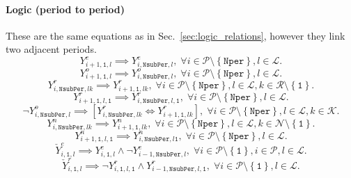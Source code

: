 \documentclass{amsbook}
\begin{document}
\paragraph{Logic (period to period)}
%
These are the same equations as in Sec.~\ref{sec:logic_relations}, however they
link two adjacent periods.
\begin{equation}
    Y^e_{i+1,\mathtt{1},l} \implies Y^e_{i, \mathtt{NsubPer}, l}, \; \forall 
    i \in \mathcal{P} \setminus \left\{\mathtt{Nper}\right\},
    l\in \mathcal{L}.
\end{equation}
%
%
\begin{equation}
    Y^o_{i+1,\mathtt{1},l} \implies Y^o_{i,\mathtt{NsubPer},l}, \; \forall 
    i \in \mathcal{P} \setminus \left\{\mathtt{Nper}\right\},
    l\in \mathcal{L}.
\end{equation}
%
%
\begin{equation}
    Y^r_{i,\mathtt{NsubPer},lk} \implies Y^r_{i+1, \mathtt{1}, lk}, \; \forall 
    i \in \mathcal{P} \setminus \left\{\mathtt{Nper}\right\},
    l\in \mathcal{L},
    k\in \mathcal{R} \setminus \left\{\mathtt{1}\right\}.
\end{equation}
%
%
\begin{equation}
    Y^r_{i+1, \mathtt{1}, l,\mathtt{1}} \implies 
    Y^r_{i,\mathtt{NsubPer},l,\mathtt{1}} , \; \forall 
    i \in \mathcal{P} \setminus \left\{\mathtt{Nper}\right\},
    l\in \mathcal{L}.
\end{equation}
%
%
\begin{equation}
    \neg Y^o_{i,\mathtt{NsubPer},l} \implies 
    \left[Y^r_{i,\mathtt{NsubPer},lk} \iff 
    Y^r_{i+1,\mathtt{1},lk}\right]
    , \; \forall
    i \in \mathcal{P} \setminus \left\{\mathtt{Nper}\right\},
    l \in \mathcal{L},
    k \in \mathcal{K}.
\end{equation}
%
%
\begin{equation}
    Y^n_{i,\mathtt{NsubPer},lk} \implies 
    Y^n_{i+1,\mathtt{1}, lk}, \; \forall 
    i \in \mathcal{P} \setminus \left\{\mathtt{Nper}\right\},
    l\in \mathcal{L},
    k\in \mathcal{N} \setminus \left\{\mathtt{1}\right\}.
\end{equation}
%
%
\begin{equation}
    Y^n_{i+1,\mathtt{1}, l,\mathtt{1}} \implies 
    Y^n_{i,\mathtt{NsubPer},l\mathtt{1}} , \; \forall 
    i \in \mathcal{P} \setminus \left\{\mathtt{Nper}\right\},
    l\in \mathcal{L}.
\end{equation}
%
%
%
\begin{equation}
    \check{Y}^e_{i,\mathtt{1},l} \implies 
    Y^e_{i,\mathtt{1},l} \wedge \neg Y^e_{i-1,\mathtt{NsubPer},l}, \;
    \forall 
    i \in \mathcal{P} \setminus \left\{\mathtt{1}\right\},
    i \in \mathcal{P} ,
    l \in \mathcal{L}.
\end{equation}
%
\begin{equation}
    \check{Y}^r_{i,\mathtt{1},l} \implies 
    \neg Y^r_{i,\mathtt{1},l,\mathtt{1}} \wedge 
    Y^r_{i-1,\mathtt{NsubPer},l,\mathtt{1}}, \;
    \forall 
    i \in \mathcal{P} \setminus \left\{\mathtt{1}\right\},
    l \in \mathcal{L}.
\end{equation}
\end{document}
